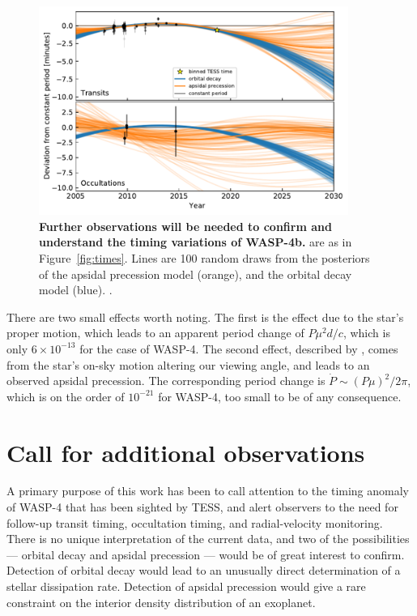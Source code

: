 \documentclass[12pt,twocolumn,tighten]{aastex62}
\begin{document}
\begin{figure}[t]
	\begin{center}
		\leavevmode
		\includegraphics[width=0.9\textwidth]{f7.pdf}
	\end{center}
	\vspace{-0.7cm}
	\caption{
    {\bf Further observations will be needed to confirm and understand
    the timing variations of WASP-4b.}  are as
    in Figure~\ref{fig:times}.  Lines are 100 random draws from the
    posteriors of the apsidal precession model (orange), and the
    orbital decay model (blue).  .    
		\label{fig:future}
	}
\end{figure}

There are two  small effects worth noting.  The
first is the \citet{shklovskii_possible_1970} effect due to the star's
proper motion, which leads to an apparent period change of $P\mu^2 d/
c$, which is only $6\times10^{-13}$ for the case of WASP-4.  The
second effect, described by \citet{rafikov_stellar_2009}, comes from
the star's on-sky motion altering our viewing angle, and leads to an
observed apsidal precession. The corresponding period change is
$\dot{P} \sim (P\mu)^2/2\pi$, which is on the order of $10^{-21}$ for
WASP-4, too small to be of any consequence.


\section{Call for additional observations}
\label{sec:future}

A primary purpose of this work has been to call attention to the
timing anomaly of WASP-4 that has been sighted by TESS, and alert
observers to the need for follow-up transit timing, occultation
timing, and radial-velocity monitoring.  There is no unique
interpretation of the current data, and two of the possibilities ---
orbital decay and apsidal precession --- would be of great interest to
confirm. Detection of orbital decay would lead to an unusually direct
determination of a stellar dissipation rate. Detection of apsidal
precession would give a rare constraint on the interior density
distribution of an exoplanet.
\end{document}
